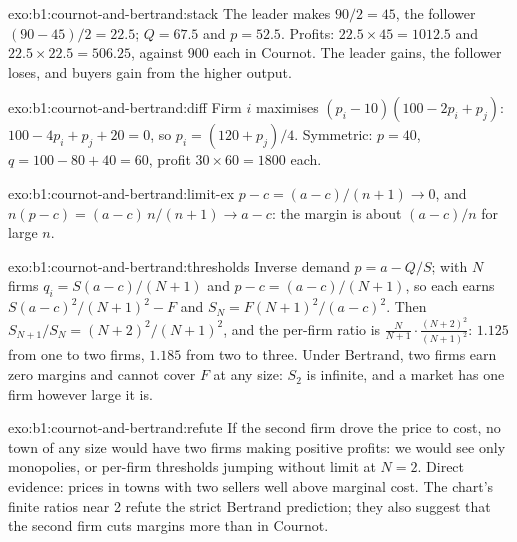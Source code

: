 \begin{solution}{exo:b1:cournot-and-bertrand:stack}
The leader makes $90/2 = 45$, the follower $(90 - 45)/2 = 22.5$; $Q = 67.5$ and $p = 52.5$.
Profits: $22.5 \times 45 = 1012.5$ and $22.5 \times 22.5 = 506.25$, against 900 each in Cournot. The
leader gains, the follower loses, and buyers gain from the higher output.
\end{solution}

\begin{solution}{exo:b1:cournot-and-bertrand:diff}
Firm $i$ maximises $(p_i - 10)(100 - 2p_i + p_j)$: $100 - 4p_i + p_j + 20 = 0$, so
$p_i = (120 + p_j)/4$. Symmetric: $p = 40$, $q = 100 - 80 + 40 = 60$, profit $30 \times 60 = 1800$
each.
\end{solution}

\begin{solution}{exo:b1:cournot-and-bertrand:limit-ex}
$p - c = (a - c)/(n + 1) \to 0$, and $n(p - c) = (a - c)\,n/(n + 1) \to a - c$: the margin is
about $(a - c)/n$ for large $n$.
\end{solution}

\begin{solution}{exo:b1:cournot-and-bertrand:thresholds}
Inverse demand $p = a - Q/S$; with $N$ firms $q_i = S(a - c)/(N + 1)$ and
$p - c = (a - c)/(N + 1)$, so each earns $S(a - c)^2/(N + 1)^2 - F$ and
$S_N = F(N + 1)^2/(a - c)^2$. Then $S_{N+1}/S_N = (N + 2)^2/(N + 1)^2$, and the per-firm ratio
is $\frac{N}{N+1}\cdot\frac{(N + 2)^2}{(N + 1)^2}$: $1.125$ from one to two firms, $1.185$ from two to
three. Under Bertrand, two firms earn zero margins and cannot cover $F$ at
any size: $S_2$ is infinite, and a market has one firm however large it is.
\end{solution}

\begin{solution}{exo:b1:cournot-and-bertrand:refute}
If the second firm drove the price to cost, no town of any size would
have two firms making positive profits: we would see only monopolies, or
per-firm thresholds jumping without limit at $N = 2$. Direct evidence: prices
in towns with two sellers well above marginal cost. The chart's finite
ratios near 2 refute the strict Bertrand prediction; they also suggest
that the second firm cuts margins more than in Cournot.
\end{solution}

